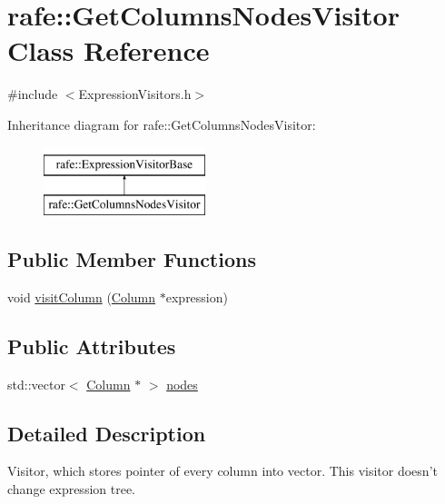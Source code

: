 \hypertarget{classrafe_1_1_get_columns_nodes_visitor}{\section{rafe\+:\+:Get\+Columns\+Nodes\+Visitor Class Reference}
\label{classrafe_1_1_get_columns_nodes_visitor}
}


{\ttfamily \#include $<$Expression\+Visitors.\+h$>$}

Inheritance diagram for rafe\+:\+:Get\+Columns\+Nodes\+Visitor\+:\begin{figure}[H]
\begin{center}
\leavevmode
\includegraphics[height=2.000000cm]{classrafe_1_1_get_columns_nodes_visitor}
\end{center}
\end{figure}
\subsection*{Public Member Functions}
\begin{DoxyCompactItemize}
\item 
void \hyperlink{classrafe_1_1_get_columns_nodes_visitor_a60dd06cf2b318397476a9eba5e32a078}{visit\+Column} (\hyperlink{classrafe_1_1_column}{Column} $\ast$expression)
\end{DoxyCompactItemize}
\subsection*{Public Attributes}
\begin{DoxyCompactItemize}
\item 
std\+::vector$<$ \hyperlink{classrafe_1_1_column}{Column} $\ast$ $>$ \hyperlink{classrafe_1_1_get_columns_nodes_visitor_a33e85438a4b6d2474edb7ba51732c773}{nodes}
\end{DoxyCompactItemize}


\subsection{Detailed Description}
Visitor, which stores pointer of every column into vector. This visitor doesn't change expression tree. 

